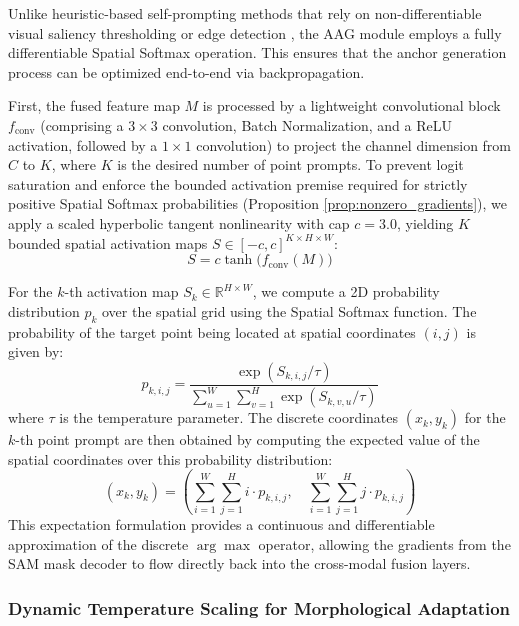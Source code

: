 \documentclass[onecolumn]{IEEEtran}
\numberwithin{equation}{section}
\theoremstyle{definition}
\theoremstyle{remark}
\begin{document}
Unlike heuristic-based self-prompting methods that rely on non-differentiable visual saliency thresholding or edge detection \cite{xie2025self, chen2024un}, the AAG module employs a fully differentiable Spatial Softmax operation. This ensures that the anchor generation process can be optimized end-to-end via backpropagation.

First, the fused feature map $M$ is processed by a lightweight convolutional block $f_{\text{conv}}$ (comprising a $3 \times 3$ convolution, Batch Normalization, and a ReLU activation, followed by a $1 \times 1$ convolution) to project the channel dimension from $C$ to $K$, where $K$ is the desired number of point prompts. To prevent logit saturation and enforce the bounded activation premise required for strictly positive Spatial Softmax probabilities (Proposition \ref{prop:nonzero_gradients}), we apply a scaled hyperbolic tangent nonlinearity with cap $c = 3.0$, yielding $K$ bounded spatial activation maps $S \in [-c, c]^{K \times H \times W}$:
\begin{equation}
    S = c \tanh\!\big(f_{\text{conv}}(M)\big)
\end{equation}

For the $k$-th activation map $S_k \in \mathbb{R}^{H \times W}$, we compute a 2D probability distribution $p_k$ over the spatial grid using the Spatial Softmax function. The probability of the target point being located at spatial coordinates $(i, j)$ is given by:
\begin{equation}
    p_{k, i, j} = \frac{\exp(S_{k, i, j} / \tau)}{\sum_{u=1}^{W} \sum_{v=1}^{H} \exp(S_{k, v, u} / \tau)}
\end{equation}
where $\tau$ is the temperature parameter. The discrete coordinates $(x_k, y_k)$ for the $k$-th point prompt are then obtained by computing the expected value of the spatial coordinates over this probability distribution:
\begin{equation}
    (x_k, y_k) = \left( \sum_{i=1}^{W} \sum_{j=1}^{H} i \cdot p_{k, i, j}, \quad \sum_{i=1}^{W} \sum_{j=1}^{H} j \cdot p_{k, i, j} \right)
\end{equation}
This expectation formulation provides a continuous and differentiable approximation of the discrete $\arg\max$ operator, allowing the gradients from the SAM mask decoder to flow directly back into the cross-modal fusion layers.

\subsubsection{Dynamic Temperature Scaling for Morphological Adaptation}
\end{document}
